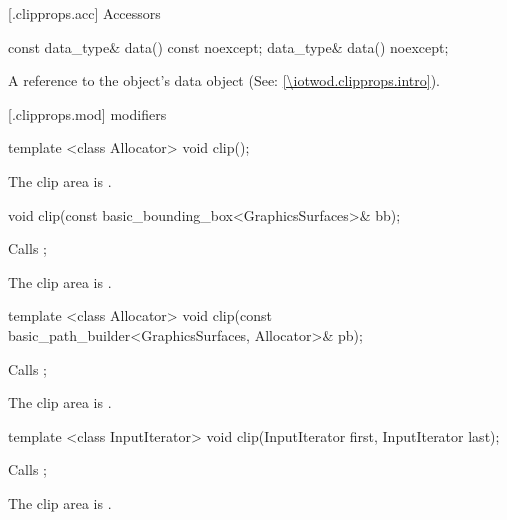  [\iotwod.clipprops.acc] {Accessors}

%
\begin{itemdecl}
const data_type& data() const noexcept;
data_type& data() noexcept;
\end{itemdecl}
\begin{itemdescr}
\pnum
\returns A reference to the  object's data object (See: \ref{\iotwod.clipprops.intro}).
\end{itemdescr}

 [\iotwod.clipprops.mod] { modifiers}

%
\begin{itemdecl}
template <class Allocator>
void clip();
\end{itemdecl}
\begin{itemdescr}
\pnum
\effects
The clip area is .
\end{itemdescr}

%
\begin{itemdecl}
void clip(const basic_bounding_box<GraphicsSurfaces>& bb);
\end{itemdecl}
\begin{itemdescr}
\pnum
\effects
Calls ;

\pnum
\remarks
The clip area is .
\end{itemdescr}

%
\begin{itemdecl}
template <class Allocator>
void clip(const basic_path_builder<GraphicsSurfaces, Allocator>& pb);
\end{itemdecl}
\begin{itemdescr}
\pnum
\effects
Calls ;

\pnum
\remarks
The clip area is .
\end{itemdescr}

%
\begin{itemdecl}
template <class InputIterator>
void clip(InputIterator first, InputIterator last);
\end{itemdecl}
\begin{itemdescr}
\pnum
\effects
Calls ;

\pnum
\remarks
The clip area is .
\end{itemdescr}

